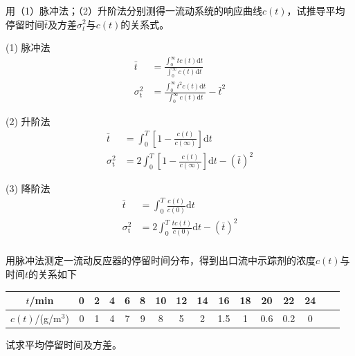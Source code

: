 \documentclass[dvipsnames, svgnames, x11names]{beamer}
\begin{document}
\begin{frame}[t]
    \frametitle{}

    \begin{example}
        用（1）脉冲法；（2）升阶法分别测得一流动系统的响应曲线$c(t)$，试推导平均停留时间$\bar{t}$及方差$\sigma_{t}^{2}$与$c(t)$的关系式。
    \end{example}
    \pause
    \begin{minipage}{0.32\linewidth}
        (1) 脉冲法
        \[
            \begin{aligned}
                \bar{t}&=\frac{\int_{0}^{\infty} t c(t) \mathrm{d} t}{\int_{0}^{\infty} c(t) \mathrm{d} t} \\
                \sigma_{\mathrm{t}}^{2}&=\frac{\int_{0}^{\infty} t^2 c(t) \mathrm{d} t}{\int_{0}^{\infty} c(t) \mathrm{d} t}-\bar{t}^{2} 
            \end{aligned}
        \]
    \end{minipage}\hfill
    \begin{minipage}{0.32\linewidth}
        (2) 升阶法
        \[
            \begin{aligned}
                \bar{t}&=\int_{0}^{T} \left[1-\frac{c(t)}{c(\infty)}\right] \mathrm{d} t \\
                \sigma_{\mathrm{t}}^{2}&=2\int_{0}^{T} \left[1-\frac{c(t)}{c(\infty)}\right] \mathrm{d} t-(\bar{t})^{2} 
            \end{aligned}
        \]
    \end{minipage}\hfill
    \begin{minipage}{0.32\linewidth}
        (3) 降阶法
        \[
            \begin{aligned}
                \bar{t}&=\int_{0}^{T} \frac{c(t)}{c(0)} \mathrm{d} t \\
                \sigma_{\mathrm{t}}^{2}&=2\int_{0}^{T} \frac{tc(t)}{c(0)} \mathrm{d} t-(\bar{t})^{2} 
            \end{aligned}
        \]
    \end{minipage}
\end{frame}


\begin{frame}[t]
    \frametitle{}
    \begin{example}
        用脉冲法测定一流动反应器的停留时间分布，得到出口流中示踪剂的浓度$c(t)$与时间$t$的关系如下
        \begin{table}
            \centering
            \begin{tabular}{cccccccccccccccc}
                \bottomrule
                $t$/min & 0 & 2 & 4 & 6 & 8 & 10 & 12 & 14 & 16 & 18 & 20 & 22 & 24 \\ \hline
                $c(t)$/(g/m$^3$) & 0 & 1 & 4 & 7 & 9 & 8 & 5 & 2 & 1.5 & 1 & 0.6 & 0.2 & 0 \\ \toprule
            \end{tabular}
        \end{table}
        试求平均停留时间及方差。
    \end{example}
\end{frame}
\end{document}
